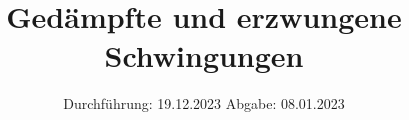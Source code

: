 

\subject{v354}
\title{Gedämpfte und erzwungene Schwingungen}
\date{%
  Durchführung: 19.12.2023
  \hspace{3em}
  Abgabe: 08.01.2023
}



\maketitle
\thispagestyle{empty}
\tableofcontents
\newpage






\printbibliography{}

